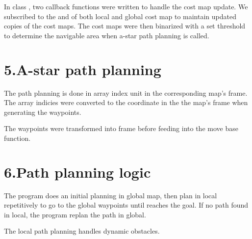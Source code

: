 \documentclass{article}
\begin{document}
\noindent{}In class , two callback functions were written to handle the cost map update. We subscribed to the  and  of both local and global cost map to maintain updated copies of the cost maps. The cost maps were then binarized with a set threshold to determine the navigable area when a-star path planning is called.%

\section{5.\hspace*{0.5em}A-star path planning}\label{sec-a-star-path-planning}%

\noindent{}The path planning is done in array index unit in the corresponding map's frame. The array indicies were converted to the coordinate in the the map's frame when generating the waypoints.%

The waypoints were transformed into  frame before feeding into the move base function.  %

\section{6.\hspace*{0.5em}Path planning logic}\label{sec-path-planning-logic}%

\noindent{}The program does an initial planning in global map, then plan in local repetitively to go to the global waypoints until reaches the goal. If no path found in local, the program replan the path in global.%

The local path planning handles dynamic obstacles.%
\end{document}
